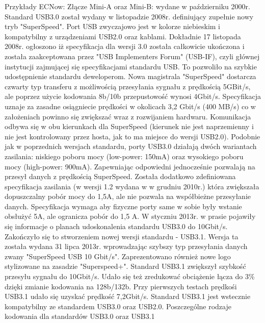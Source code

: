 \documentclass{BscUS}
\begin{document}
\newline
Przykłady ECNow:
Złącze Mini-A oraz Mini-B: wydane w październiku 2000r.\cite{USB20Doc}
\newline
\indent Standard USB3.0 został wydany w listopadzie 2008r. definiujący zupełnie nowy tryb "SuperSpeed". Port USB zwyczajowo jest w kolorze niebieskim i kompatybilny z urządzeniami USB2.0 oraz kablami.
Dokładnie 17 listopada 2008r. ogłoszono iż specyfikacja dla wersji 3.0 została całkowicie ukończona i została zaakceptowana przez "USB Implementers Forum" (USB-IF), czyli głównej instytucji zajmującej się specyfikacjami standardu USB. To pozwoliło na szybkie udostępnienie standardu deweloperom.
Nowa magistrala "SuperSpeed" dostarcza czwarty typ transferu z możliwością przesyłania sygnału z prędkością 5GBit/s, ale poprzez użycie kodowania 8b/10b przepustowość wynosi 4Gbit/s. Specyfikacja uznaje za zasadne osiągniecie prędkości w okolicach 3,2 Gbit/s (400 MB/s) co w założeniach powinno się zwiększać wraz z rozwijaniem hardwaru. Komunikacja odbywa się w obu kierunkach dla SuperSpeed (kierunek nie jest naprzemienny i nie jest kontrolowany przez hosta, jak to ma miejsce do wersji USB2.0).
Podobnie jak w poprzednich wersjach standardu, porty USB3.0 działają dwóch wariantach zasilania: niskiego poboru mocy (low-power: 150mA) oraz wysokiego poboru mocy (high-power: 900mA). Zapewniając odpowiedni jednocześnie pozwalają na przesył danych z prędkością SuperSpeed.
Została dodatkowo zdefiniowana specyfikacja zasilania (w wersji 1.2 wydana w w grudniu 2010r.) która zwiększała dopuszczalny pobór mocy do 1,5A, ale nie pozwala na współbieżne przesyłanie danych. Specyfikacja wymaga aby fizyczne porty same w sobie były wstanie obsłużyć 5A, ale ogranicza pobór do 1,5 A.
\cite{USB30Doc}
\newline
\indent W styczniu 2013r. w prasie pojawiły się informacje o planach udoskonalenia standardu USB3.0 do 10Gbit/s. Zakończyło się to stworzeniem nowej wersji standardu - USB3.1. Wersja ta została wydana 31 lipca 2013r. wprowadzając szybszy typ przesyłania danych zwany "SuperSpeed USB 10 Gbit/s". Zaprezentowano również nowe logo stylizowane na zasadzie "Superspeed+". Standard USB3.1 zwiększył szybkość przesyłu sygnału do 10Gbit/s. Udało się też zredukować obciążenie łącza do 3\% dzięki zmianie kodowania na 128b/132b.
\newline
Przy pierwszych testach prędkośi USB3.1 udało się uzyskać prędkość 7,2Gbit/s.
\newline
Standard USB3.1 jest wstecznie kompatybilny ze standardem USB3.0 oraz USB2.0.
\cite{USB30Doc}
\newline
\indent Poszczególne rodzaje kodowania dla standardów USB3.0 oraz USB3.1
\end{document}
